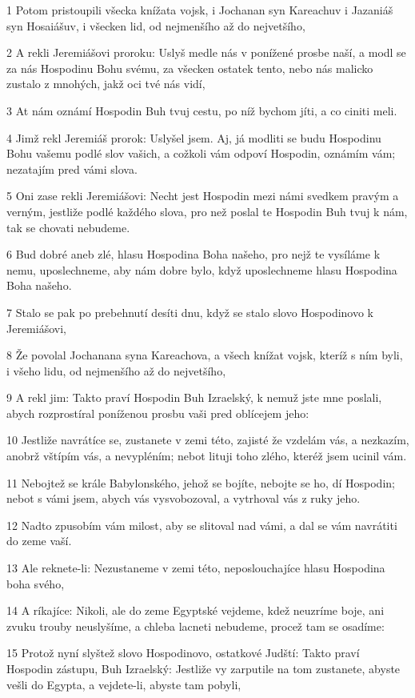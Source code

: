 \par 1 Potom pristoupili všecka knížata vojsk, i Jochanan syn Kareachuv i Jazaniáš syn Hosaiášuv, i všecken lid, od nejmenšího až do nejvetšího,
\par 2 A rekli Jeremiášovi proroku: Uslyš medle nás v ponížené prosbe naší, a modl se za nás Hospodinu Bohu svému, za všecken ostatek tento, nebo nás malicko zustalo z mnohých, jakž oci tvé nás vidí,
\par 3 At nám oznámí Hospodin Buh tvuj cestu, po níž bychom jíti, a co ciniti meli.
\par 4 Jimž rekl Jeremiáš prorok: Uslyšel jsem. Aj, já modliti se budu Hospodinu Bohu vašemu podlé slov vašich, a cožkoli vám odpoví Hospodin, oznámím vám; nezatajím pred vámi slova.
\par 5 Oni zase rekli Jeremiášovi: Necht jest Hospodin mezi námi svedkem pravým a verným, jestliže podlé každého slova, pro než poslal te Hospodin Buh tvuj k nám, tak se chovati nebudeme.
\par 6 Bud dobré aneb zlé, hlasu Hospodina Boha našeho, pro nejž te vysíláme k nemu, uposlechneme, aby nám dobre bylo, když uposlechneme hlasu Hospodina Boha našeho.
\par 7 Stalo se pak po prebehnutí desíti dnu, když se stalo slovo Hospodinovo k Jeremiášovi,
\par 8 Že povolal Jochanana syna Kareachova, a všech knížat vojsk, kteríž s ním byli, i všeho lidu, od nejmenšího až do nejvetšího,
\par 9 A rekl jim: Takto praví Hospodin Buh Izraelský, k nemuž jste mne poslali, abych rozprostíral poníženou prosbu vaši pred oblícejem jeho:
\par 10 Jestliže navrátíce se, zustanete v zemi této, zajisté že vzdelám vás, a nezkazím, anobrž vštípím vás, a nevypléním; nebot lituji toho zlého, kteréž jsem ucinil vám.
\par 11 Nebojtež se krále Babylonského, jehož se bojíte, nebojte se ho, dí Hospodin; nebot s vámi jsem, abych vás vysvobozoval, a vytrhoval vás z ruky jeho.
\par 12 Nadto zpusobím vám milost, aby se slitoval nad vámi, a dal se vám navrátiti do zeme vaší.
\par 13 Ale reknete-li: Nezustaneme v zemi této, neposlouchajíce hlasu Hospodina boha svého,
\par 14 A ríkajíce: Nikoli, ale do zeme Egyptské vejdeme, kdež neuzríme boje, ani zvuku trouby neuslyšíme, a chleba lacneti nebudeme, procež tam se osadíme:
\par 15 Protož nyní slyštež slovo Hospodinovo, ostatkové Judští: Takto praví Hospodin zástupu, Buh Izraelský: Jestliže vy zarputile na tom zustanete, abyste vešli do Egypta, a vejdete-li, abyste tam pobyli,

